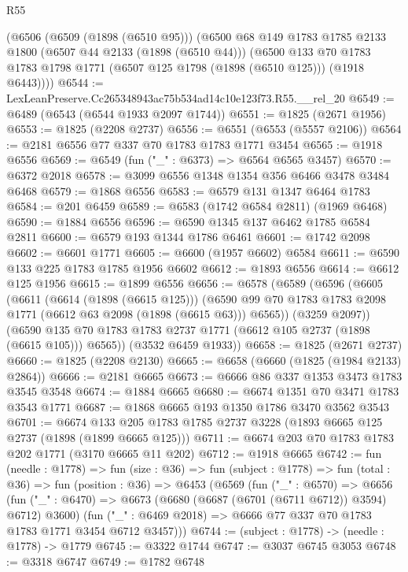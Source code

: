 \begin{lexlean}{R55}
\begin{coremodule}
    (@6506
      (@6509 (@1898 (@6510 @95)))
      (@6500
        @68
        @149
        @1783
        @1785
        @2133
        @1800
        (@6507 @44 @2133 (@1898 (@6510 @44)))
        (@6500
          @133
          @70
          @1783
          @1783
          @1798
          @1771
          (@6507 @125 @1798 (@1898 (@6510 @125)))
          (@1918 @6443))))
@6544 := LexLeanPreserve.Cc265348943ac75b534ad14c10e123f73.R55.__rel_20
@6549 := @6489 (@6543 (@6544 @1933 @2097 @1744))
@6551 := @1825 (@2671 @1956)
@6553 := @1825 (@2208 @2737)
@6556 := @6551 (@6553 (@5557 @2106))
@6564 := @2181 @6556 @77 @337 @70 @1783 @1783 @1771 @3454
@6565 := @1918 @6556
@6569 := @6549 (fun ("_" : @6373) => @6564 @6565 @3457)
@6570 := @6372 @2018
@6578 := @3099 @6556 @1348 @1354 @356 @6466 @3478 @3484 @6468
@6579 := @1868 @6556
@6583 := @6579 @131 @1347 @6464 @1783
@6584 := @201 @6459
@6589 := @6583 (@1742 @6584 @2811) (@1969 @6468)
@6590 := @1884 @6556
@6596 := @6590 @1345 @137 @6462 @1785 @6584 @2811
@6600 := @6579 @193 @1344 @1786 @6461
@6601 := @1742 @2098
@6602 := @6601 @1771
@6605 := @6600 (@1957 @6602) @6584
@6611 := @6590 @133 @225 @1783 @1785 @1956 @6602
@6612 := @1893 @6556
@6614 := @6612 @125 @1956
@6615 := @1899 @6556
@6656 := @6578
    (@6589
      (@6596
        (@6605
          (@6611
            (@6614 (@1898 (@6615 @125)))
            (@6590 @99 @70 @1783 @1783 @2098 @1771 (@6612 @63 @2098 (@1898 (@6615 @63))) @6565))
          (@3259 @2097))
        (@6590 @135 @70 @1783 @1783 @2737 @1771 (@6612 @105 @2737 (@1898 (@6615 @105))) @6565))
      (@3532 @6459 @1933))
@6658 := @1825 (@2671 @2737)
@6660 := @1825 (@2208 @2130)
@6665 := @6658 (@6660 (@1825 (@1984 @2133) @2864))
@6666 := @2181 @6665
@6673 := @6666 @86 @337 @1353 @3473 @1783 @3545 @3548
@6674 := @1884 @6665
@6680 := @6674 @1351 @70 @3471 @1783 @3543 @1771
@6687 := @1868 @6665 @193 @1350 @1786 @3470 @3562 @3543
@6701 := @6674 @133 @205 @1783 @1785 @2737 @3228 (@1893 @6665 @125 @2737 (@1898 (@1899 @6665 @125)))
@6711 := @6674 @203 @70 @1783 @1783 @202 @1771 (@3170 @6665 @11 @202)
@6712 := @1918 @6665
@6742 := fun (needle : @1778) =>
  fun (size : @36) =>
  fun (subject : @1778) =>
  fun (total : @36) =>
  fun (position : @36) =>
  @6453
    (@6569
      (fun ("_" : @6570) =>
      @6656
        (fun ("_" : @6470) => @6673 (@6680 (@6687 (@6701 (@6711 @6712)) @3594) @6712) @3600)
        (fun ("_" : @6469 @2018) => @6666 @77 @337 @70 @1783 @1783 @1771 @3454 @6712 @3457)))
@6744 := (subject : @1778) -> (needle : @1778) -> @1779
@6745 := @3322 @1744
@6747 := @3037 @6745 @3053
@6748 := @3318 @6747
@6749 := @1782 @6748

\end{coremodule}
\end{lexlean}
